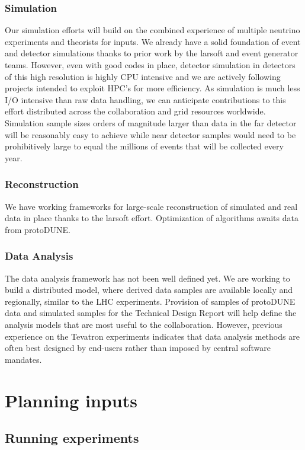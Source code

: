 \subsubsection{Simulation}  Our simulation efforts will build on the combined experience of multiple neutrino experiments and theorists for inputs.  We already have a solid foundation of event and detector simulations thanks to prior work by the larsoft and event generator teams.  However,   even with good codes in place, detector simulation in detectors of this high resolution is highly CPU intensive and we are actively following projects intended to exploit HPC's for more efficiency.  As simulation is much less I/O intensive than raw data handling,  we can anticipate contributions to this effort distributed across the collaboration and grid resources worldwide. Simulation sample sizes orders of magnitude larger than data in the  far detector will be reasonably easy to achieve while near detector samples would need to be prohibitively large to equal the millions of events that will be collected every year. 

\subsubsection{Reconstruction} We have working frameworks for large-scale reconstruction of simulated and real data in place thanks to the larsoft effort.  Optimization of algorithms awaits data from protoDUNE. 
 
 \subsubsection{Data Analysis}
 The data analysis framework has not been well defined yet.  We are working to build a distributed model, where derived data samples are available locally and regionally, similar to the LHC experiments.   Provision of samples  of protoDUNE data and simulated samples for the Technical Design Report will help define the analysis models that are most useful to the collaboration. However,  previous experience on the Tevatron experiments indicates that data analysis methods are often best designed by end-users rather than imposed by central software mandates. 
 
 
\section{Planning inputs}


\subsection{Running experiments}\label{sw:IF-input}

